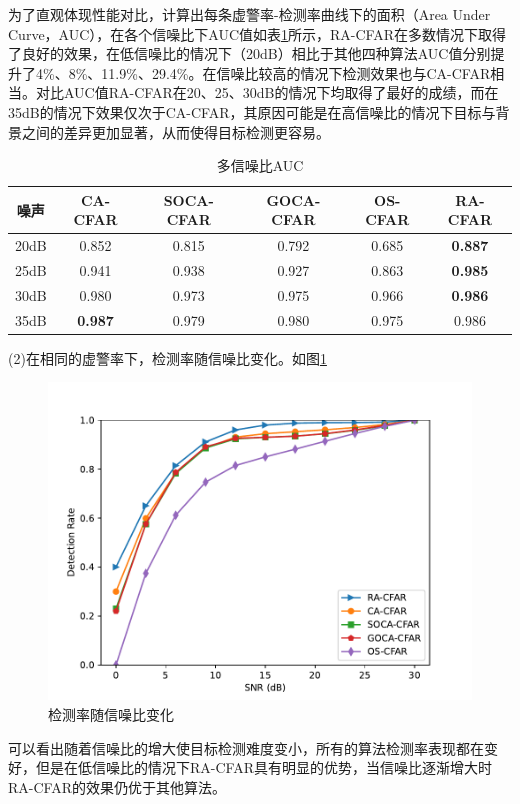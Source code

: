 \par
为了直观体现性能对比，计算出每条虚警率-检测率曲线下的面积（Area Under Curve，AUC），在各个信噪比下AUC值如表\ref{多信噪比AUC}所示，RA-CFAR在多数情况下取得了良好的效果，在低信噪比的情况下（20dB）相比于其他四种算法AUC值分别提升了4\%、8\%、11.9\%、29.4\%。在信噪比较高的情况下检测效果也与CA-CFAR相当。对比AUC值RA-CFAR在20、25、30dB的情况下均取得了最好的成绩，而在35dB的情况下效果仅次于CA-CFAR，其原因可能是在高信噪比的情况下目标与背景之间的差异更加显著，从而使得目标检测更容易。
\begin{table}[htbp]
	\centering
	\tabcolsep=2mm
	\caption{多信噪比AUC}
	\begin{tabular}{cccccc}
		\toprule
		噪声 & CA-CFAR  & SOCA-CFAR & GOCA-CFAR&OS-CFAR& \textbf{RA-CFAR} \\
		\midrule
		20dB & 0.852 & 0.815 & 0.792 & 0.685 & \textbf{0.887}\\
		25dB & 0.941 & 0.938 & 0.927 & 0.863 & \textbf{0.985} \\
		30dB & 0.980 & 0.973 & 0.975 & 0.966 & \textbf{0.986}\\
		35dB & \textbf{0.987} & 0.979 & 0.980 & 0.975 & 0.986\\
		\bottomrule
	\end{tabular}
	\label{多信噪比AUC}
\end{table}


(2)在相同的虚警率下，检测率随信噪比变化。如图\ref{fig:检测率随信噪比变化}
\begin{figure}[htbp]
	\centering
	\includegraphics[width = 0.6\linewidth]{figures/检测率随信噪比变化.pdf}
	\caption{检测率随信噪比变化}
	\label{fig:检测率随信噪比变化}
\end{figure}
可以看出随着信噪比的增大使目标检测难度变小，所有的算法检测率表现都在变好，但是在低信噪比的情况下RA-CFAR具有明显的优势，当信噪比逐渐增大时RA-CFAR的效果仍优于其他算法。

